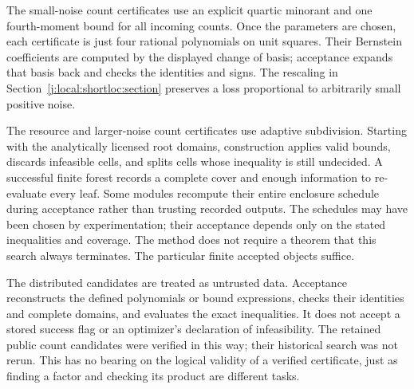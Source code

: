 The small-noise count certificates use an explicit quartic minorant and
one fourth-moment bound for all incoming counts. Once the parameters are
chosen, each certificate is just four rational polynomials on unit squares.
Their Bernstein coefficients are computed by the displayed change of basis;
acceptance expands that basis back and checks the identities and signs.
The rescaling in Section~\ref{j:local:shortloc:section} preserves a loss
proportional to arbitrarily small positive noise.

The resource and larger-noise count certificates use adaptive subdivision.
Starting with the analytically licensed root domains, construction
applies valid bounds, discards infeasible cells, and splits cells whose
inequality is still undecided. A successful finite forest records a
complete cover and enough information to re-evaluate every leaf. Some
modules recompute their entire enclosure schedule during acceptance
rather than trusting recorded outputs. The schedules may have been
chosen by experimentation; their acceptance depends only on the stated
inequalities and coverage. The method does not require a theorem that
this search always terminates. The particular finite accepted objects
suffice.

The distributed candidates are treated as untrusted data. Acceptance
reconstructs the defined polynomials or bound expressions, checks their
identities and complete domains, and evaluates the exact inequalities.
It does not accept a stored success flag or an optimizer's declaration
of infeasibility. The retained public count candidates were verified in this
way; their historical search was not rerun. This has no bearing on the
logical validity of a verified certificate, just as finding a factor
and checking its product are different tasks.

